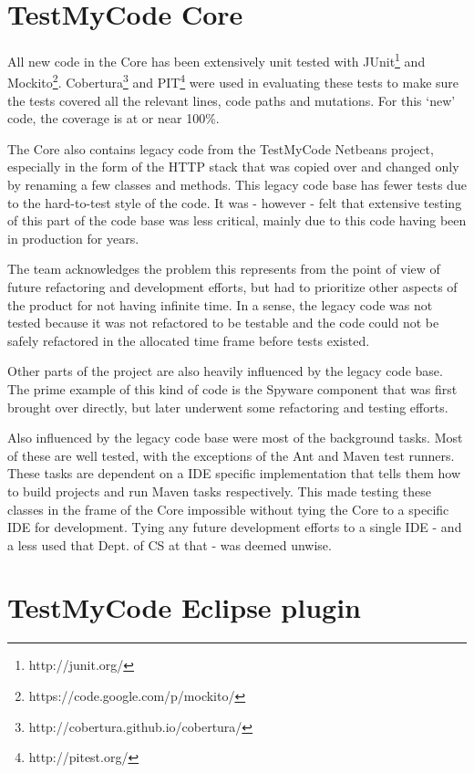 \documentclass[12pt,a4paper,english,leqno]{article}
\begin{document}
\section{TestMyCode Core}

All new code in the Core has been extensively unit tested with JUnit\footnote{http://junit.org/} and Mockito\footnote{https://code.google.com/p/mockito/}.
Cobertura\footnote{http://cobertura.github.io/cobertura/} and  PIT\footnote{http://pitest.org/} were used in evaluating these tests to make sure the tests covered all the relevant lines, code paths and mutations. For this `new' code, the coverage is at or near 100\%.

The Core also contains legacy code from the TestMyCode Netbeans project, especially in the form of the HTTP stack that was copied over and changed only by renaming a few classes and methods.
This legacy code base has fewer tests due to the hard-to-test style of the code.
It was - however - felt that extensive testing of this part of the code base was less critical, mainly due to this code having been in production for years.

The team acknowledges the problem this represents from the point of view of future refactoring and development efforts, but had to prioritize other aspects of the product for not having infinite time.
In a sense, the legacy code was not tested because it was not refactored to be testable and the code could not be safely refactored in the allocated time frame before tests existed.

Other parts of the project are also heavily influenced by the legacy code base. The prime example of this kind of code is the Spyware component that was first brought over directly, but later underwent some refactoring and testing efforts.

Also influenced by the legacy code base were most of the background tasks. Most of these are well tested, with the exceptions of the Ant and Maven test runners.
These tasks are dependent on a IDE specific implementation that tells them how to build projects and run Maven tasks respectively.
This made testing these classes in the frame of the Core impossible without tying the Core to a specific IDE for development.
Tying any future development efforts to a single IDE - and a less used that Dept. of CS at that - was deemed unwise.
 
\section{TestMyCode Eclipse plugin}
\end{document}
